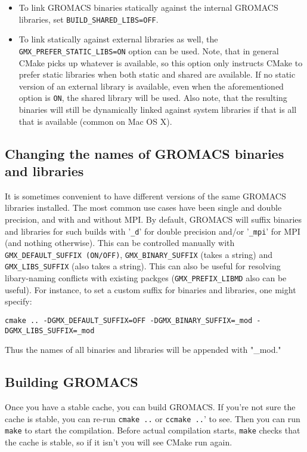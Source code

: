 \documentclass{article}[12pt,a4paper,twoside]
\newcommand{\gromacs}{GROMACS}
\newcommand{\mpi}{MPI}
\newcommand{\cmake}{CMake}
\begin{document}
\begin{enumerate}
\begin{itemize}
\item To link \gromacs{} binaries
statically against the internal \gromacs{} libraries, set
\verb+BUILD_SHARED_LIBS=OFF+.
\item To link statically against external
libraries as well, the \verb+GMX_PREFER_STATIC_LIBS=ON+ option can be
used. Note, that in general \cmake{} picks up whatever is available,
so this option only instructs \cmake{} to prefer static libraries when
both static and shared are available. If no static version of an
external library is available, even when the aforementioned option is
\verb+ON+, the shared library will be used. Also note, that the resulting
binaries will still be dynamically linked against system libraries if
that is all that is available (common on Mac OS X).
\end{itemize}

\subsection{Changing the names of GROMACS binaries and libraries}
It is sometimes convenient to have different versions of the same
\gromacs{} libraries installed. The most common use cases have been
single and double precision, and with and without \mpi{}. By default,
\gromacs{} will suffix binaries and libraries for such builds with
'\verb+_d+' for double precision and/or '\verb+_mpi+' for \mpi{} (and
nothing otherwise). This can be controlled manually with
\verb+GMX_DEFAULT_SUFFIX (ON/OFF)+, \verb+GMX_BINARY_SUFFIX+ (takes 
a string) and \verb+GMX_LIBS_SUFFIX+ (also takes a string). 
This can also be useful for resolving libary-naming conflicts with 
existing packges (\verb+GMX_PREFIX_LIBMD+ also can be useful).
For instance, to set a custom suffix for binaries and libraries, 
one might specify:

\begin{verbatim}
cmake .. -DGMX_DEFAULT_SUFFIX=OFF -DGMX_BINARY_SUFFIX=_mod -DGMX_LIBS_SUFFIX=_mod
\end{verbatim}

Thus the names of all binaries and libraries will be appended with
"\_mod."

\subsection{Building \gromacs{}}

Once you have a stable cache, you can build \gromacs{}. If you're not
sure the cache is stable, you can re-run \verb+cmake ..+ or
\verb+ccmake ..+' to see. Then you can run \verb+make+ to start the
compilation. Before actual compilation starts, \verb+make+ checks
that the cache is stable, so if it isn't you will see \cmake{} run
again.


\end{enumerate}
\end{document}
